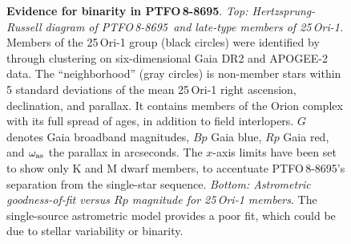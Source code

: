\documentclass[12pt,twocolumn,tighten]{aastex62}
\newcommand{\ptfo}{PTFO$\,$8-8695}
\begin{document}
\begin{figure}[t]
	\begin{center}
		\leavevmode
		
		\vspace{-0.7cm}
	\end{center}
	\vspace{-0.7cm}
	\caption{ {\bf Evidence for binarity in \ptfo}.
    {\it Top: Hertzsprung-Russell diagram of \ptfo\ and late-type
    members of 25$\,$Ori-1.} Members of the 25$\,$Ori-1 group (black
    circles) were identified by \citet{kounkel_apogee2_2018} through
    clustering on six-dimensional Gaia DR2 and APOGEE-2 data.  The
    ``neighborhood'' (gray circles) is non-member stars within 5
    standard deviations of the mean 25$\,$Ori-1 right ascension,
    declination, and parallax.  It contains members of the Orion
    complex with its full spread of ages, in addition to field
    interlopers.  $G$ denotes Gaia broadband magnitudes, $Bp$ Gaia
    blue, $Rp$ Gaia red, and $\omega_{\rm as}$ the parallax in
    arcseconds.  The $x$-axis limits have been set to show only K and
    M dwarf members, to accentuate \ptfo's separation from the
    single-star sequence.  {\it Bottom: Astrometric goodness-of-fit
    versus $Rp$ magnitude for 25$\,$Ori-1 members}.  The single-source
    astrometric model provides a poor fit, which could be due to
    stellar variability or binarity.
		\label{fig:gaia}
	}
\end{figure}
\end{document}

